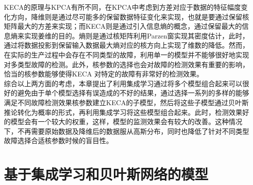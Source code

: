 KECA的原理与KPCA有所不同，在KPCA中考虑到方差对应于数据的特征幅度变化方向，降维则是通过尽可能多的保留数据特征变化来实现，也就是要通过保留核矩阵最大的方差来实现；而KECA则是通过引入信息熵的概念，通过保留最大的信息熵来实现姜维的目的。熵则是通过核矩阵利用Parzen窗实现其密度估计，此时，通过将数据投影到保留输入数据最大熵对应的核方向上实现了维数的降低。然而，在实际的生产过程中会存在不同类型的故障，利用单一的模型并不能够很好地实现对多类型故障的检测。此外，核参数的选择也会对故障的检测效果有重要的影响，恰当的核参数能够使得KECA 对特定的故障有非常好的检测效果。\\
综合以上两方面的考虑，本章提出了利用集成学习通过将多个模型组合起来可以很好的避免由于单个模型选择有误造成的不好的结果，通过选择一系列的多样的能够满足不同故障检测效果核参数建立KECA的子模型，然后将这些子模型通过贝叶斯推论转化为概率的形式，再利用集成学习将这些模型组合起来。此时，检测效果好的模型会有一个较大的权重，这样，模型的监测效果会有较大的改善。这种情况下，不再需要原始数据及降维后的数据服从高斯分布，同时也降低了针对不同类型故障选择合适核参数时候的盲目性。

\section{基于集成学习和贝叶斯网络的模型}
